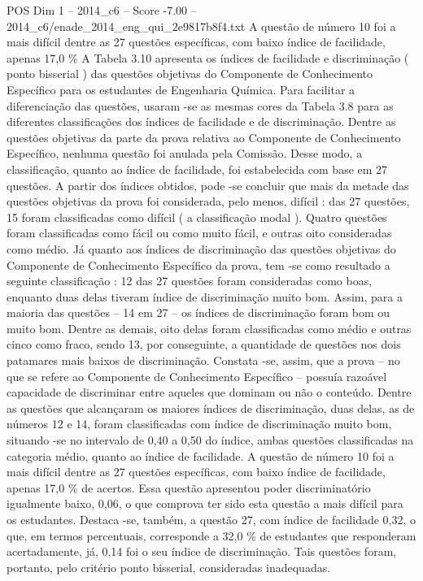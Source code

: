 \begin{textsample}{POS Dim 1 – 2014\_c6 – Score -7.00 – 2014\_c6/enade\_2014\_eng\_qui\_2e9817b8f4.txt}
A questão de número 10 foi a mais difícil dentre as 27 questões específicas, com baixo índice de facilidade, apenas 17,0 \% A Tabela 3.10 apresenta os índices de facilidade e discriminação ( ponto bisserial ) das questões objetivas do Componente de Conhecimento Específico para os estudantes de Engenharia Química.
Para facilitar a diferenciação das questões, usaram -se as mesmas cores da Tabela 3.8 para as diferentes classificações dos índices de facilidade e de discriminação.
Dentre as questões objetivas da parte da prova relativa ao Componente de Conhecimento Específico, nenhuma questão foi anulada pela Comissão.
Desse modo, a classificação, quanto ao índice de facilidade, foi estabelecida com base em 27 questões.
A partir dos índices obtidos, pode -se concluir que mais da metade das questões objetivas da prova foi considerada, pelo menos, difícil : das 27 questões, 15 foram classificadas como difícil ( a classificação modal ).
Quatro questões foram classificadas como fácil ou como muito fácil, e outras oito consideradas como médio.
Já quanto aos índices de discriminação das questões objetivas do Componente de Conhecimento Específico da prova, tem -se como resultado a seguinte classificação : 12 das 27 questões foram consideradas como boas, enquanto duas delas tiveram índice de discriminação muito bom.
Assim, para a maioria das questões – 14 em 27 – os índices de discriminação foram bom ou muito bom.
Dentre as demais, oito delas foram classificadas como médio e outras cinco como fraco, sendo 13, por conseguinte, a quantidade de questões nos dois patamares mais baixos de discriminação.
Constata -se, assim, que a prova – no que se refere ao Componente de Conhecimento Específico – possuía razoável capacidade de discriminar entre aqueles que dominam ou não o conteúdo.
Dentre as questões que alcançaram os maiores índices de discriminação, duas delas, as de números 12 e 14, foram classificadas com índice de discriminação muito bom, situando -se no intervalo de 0,40 a 0,50 do índice, ambas questões classificadas na categoria médio, quanto ao índice de facilidade.
A questão de número 10 foi a mais difícil dentre as 27 questões específicas, com baixo índice de facilidade, apenas 17,0 \% de acertos.
Essa questão apresentou poder discriminatório igualmente baixo, 0,06, o que comprova ter sido esta questão a mais difícil para os estudantes.
Destaca -se, também, a questão 27, com índice de facilidade 0,32, o que, em termos percentuais, corresponde a 32,0 \% de estudantes que responderam acertadamente, já, 0,14 foi o seu índice de discriminação.
Tais questões foram, portanto, pelo critério ponto bisserial, consideradas inadequadas.

\end{textsample}
